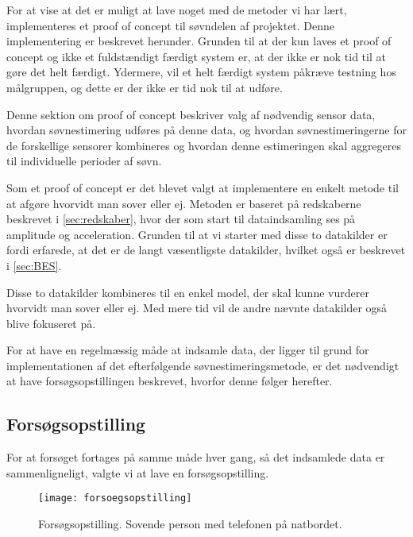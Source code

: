 For at vise at det er muligt at lave noget med de metoder vi har lært, implementeres et proof of concept til søvndelen af projektet. 
Denne implementering er beskrevet herunder.
Grunden til at der kun laves et proof of concept og ikke et fuldstændigt færdigt system er, at der ikke er nok tid til at gøre det helt færdigt. 
Ydermere, vil et helt færdigt system påkræve testning hos målgruppen, og dette er der ikke er tid nok til at udføre. 

Denne sektion om proof of concept beskriver valg af nødvendig sensor data, hvordan søvnestimering udføres på denne data, og hvordan søvnestimeringerne for de forskellige sensorer kombineres og hvordan denne estimeringen skal aggregeres til individuelle perioder af søvn.


Som et proof of concept er det blevet valgt at implementere en enkelt metode til at afgøre hvorvidt man sover eller ej.
Metoden er baseret på redskaberne beskrevet i \cref{sec:redskaber}, hvor der som start til dataindsamling ses på amplitude og acceleration.
Grunden til at vi starter med disse to datakilder er fordi \citet{6563918} erfarede, at det er de langt væsentligste datakilder, hvilket også er beskrevet i \cref{sec:BES}.

Disse to datakilder kombineres til en enkel model, der skal kunne vurderer hvorvidt man sover eller ej.
Med mere tid vil de andre nævnte datakilder også blive fokuseret på.

For at have en regelmæssig måde at indsamle data, der ligger til grund for implementationen af det efterfølgende søvnestimeringsmetode, er det nødvendigt at have forsøgsopstillingen beskrevet, hvorfor denne følger herefter.
\subsection{Forsøgsopstilling}
For at forsøget fortages på samme måde hver gang, så det indsamlede data er sammenligneligt, valgte vi at lave en forsøgsopstilling.
\begin{figure}[h]
	\centering
	\texttt{[image: forsoegsopstilling]}
	\caption{Forsøgsopstilling. Sovende person med telefonen på natbordet.}
	\label{fig:forsoegopstillings}
\end{figure}

